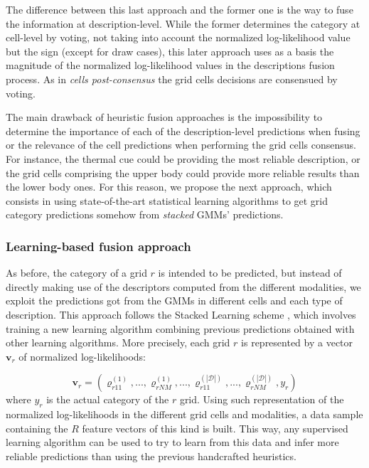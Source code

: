 \documentclass[10pt,twocolumn,letterpaper]{article}
\begin{document}
The difference between this last approach and the former one is the way to fuse the information at description-level. While the former determines the category at cell-level by voting, not taking into account the normalized log-likelihood value but the sign (except for draw cases), this later approach uses as a basis the magnitude of the normalized log-likelihood values in the descriptions fusion process. As in \textit{cells post-consensus} the grid cells decisions are consensued by voting.

The main drawback of heuristic fusion approaches is the impossibility to determine the importance of each of the description-level predictions when fusing or the relevance of the cell predictions when performing the grid cells consensus. For instance, the thermal cue could be providing the most reliable description, or the grid cells comprising the upper body could provide more reliable results than the lower body ones. For this reason, we propose the next approach, which consists in using state-of-the-art statistical learning algorithms to get grid category predictions somehow from \textit{stacked} GMMs' predictions.

\subsubsection{Learning-based fusion approach}

As before, the category of a grid $r$ is intended to be predicted, but instead of directly making use of the descriptors computed from the different modalities, we exploit the predictions got from the GMMs in different cells and each type of description. This approach follows the Stacked Learning scheme \cite{cohen2005stacked, puertas2013generalized}, which involves training a new learning algorithm combining previous predictions obtained with other learning algorithms. More precisely, each grid $r$ is represented by a vector $\mathbf{v}_r$ of normalized log-likelihoods:

$$\mathbf{v}_r = (\varrho_{r11}^{(1)}, ..., \varrho_{rNM}^{(1)}, ..., \varrho_{r11}^{(|\mathcal{D}|)}, ..., \varrho_{rNM}^{(|\mathcal{D}|)}, y_r)$$
where $y_r$ is the actual category of the $r$ grid. Using such representation of the normalized log-likelihoods in the different grid cells and modalities, a data sample containing the $R$ feature vectors of this kind is built. This way, any supervised learning algorithm can be used to try to learn from this data and infer more reliable predictions than using the previous handcrafted heuristics. 
\end{document}
